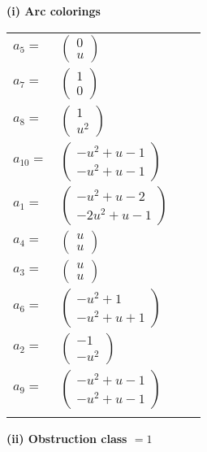\documentclass[1p]{elsarticle_modified}
\theoremstyle{definition}
\begin{document}
\flushleft \textbf{(i) Arc colorings}\\
\begin{tabular}{m{7pt} m{180pt} m{7pt} m{180pt} }
\flushright $a_{5}=$&$\begin{pmatrix}0\\u\end{pmatrix}$ \\
\flushright $a_{7}=$&$\begin{pmatrix}1\\0\end{pmatrix}$ \\
\flushright $a_{8}=$&$\begin{pmatrix}1\\u^2\end{pmatrix}$ \\
\flushright $a_{10}=$&$\begin{pmatrix}- u^2+u-1\\- u^2+u-1\end{pmatrix}$ \\
\flushright $a_{1}=$&$\begin{pmatrix}- u^2+u-2\\-2 u^2+u-1\end{pmatrix}$ \\
\flushright $a_{4}=$&$\begin{pmatrix}u\\u\end{pmatrix}$ \\
\flushright $a_{3}=$&$\begin{pmatrix}u\\u\end{pmatrix}$ \\
\flushright $a_{6}=$&$\begin{pmatrix}- u^2+1\\- u^2+u+1\end{pmatrix}$ \\
\flushright $a_{2}=$&$\begin{pmatrix}-1\\- u^2\end{pmatrix}$ \\
\flushright $a_{9}=$&$\begin{pmatrix}- u^2+u-1\\- u^2+u-1\end{pmatrix}$\\&\end{tabular}
\flushleft \textbf{(ii) Obstruction class $= 1$}\\~\\
\end{document}
